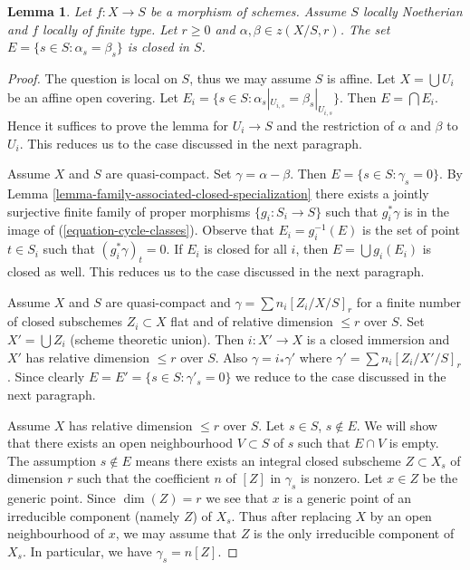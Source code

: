 \documentclass{stacks-project}
\theoremstyle{plain}
\newtheorem{lemma}[subsection]{Lemma}
\theoremstyle{definition}
\theoremstyle{remark}
\numberwithin{equation}{subsection}
\begin{document}
\begin{lemma}
\label{lemma-relative-cycles-equal}
Let $f : X \to S$ be a morphism of schemes. Assume $S$ locally Noetherian
and $f$ locally of finite type. Let $r \geq 0$ and
$\alpha, \beta \in z(X/S, r)$. The set $E = \{s \in S : \alpha_s = \beta_s\}$
is closed in $S$.
\end{lemma}

\begin{proof}
The question is local on $S$, thus we may assume $S$ is affine.
Let $X = \bigcup U_i$ be an affine open covering. Let
$E_i = \{s \in S : \alpha_s|_{U_{i, s}} = \beta_s|_{U_{i, s}}\}$.
Then $E = \bigcap E_i$. Hence it suffices to prove the lemma for
$U_i \to S$ and the restriction of $\alpha$ and $\beta$ to $U_i$.
This reduces us to the case discussed in the next paragraph.

\medskip\noindent
Assume $X$ and $S$ are quasi-compact.
Set $\gamma = \alpha - \beta$. Then $E = \{s \in S : \gamma_s = 0\}$.
By Lemma \ref{lemma-family-associated-closed-specialization}
there exists a jointly surjective finite family of proper morphisms
$\{g_i : S_i \to S\}$ such that $g_i^*\gamma$ is in the image
of (\ref{equation-cycle-classes}). Observe that $E_i = g_i^{-1}(E)$ is
the set of point $t \in S_i$ such that $(g_i^*\gamma)_t = 0$.
If $E_i$ is closed for all $i$, then $E = \bigcup g_i(E_i)$
is closed as well. This reduces us to the case discussed in the next
paragraph.

\medskip\noindent
Assume $X$ and $S$ are quasi-compact and $\gamma = \sum n_i[Z_i/X/S]_r$
for a finite number of closed subschemes $Z_i \subset X$
flat and of relative dimension $\leq r$ over $S$.
Set $X' = \bigcup Z_i$ (scheme theoretic union).
Then $i : X' \to X$ is a closed immersion and $X'$
has relative dimension $\leq r$ over $S$. Also
$\gamma = i_*\gamma'$ where $\gamma' = \sum n_i[Z_i/X'/S]_r$.
Since clearly $E = E' = \{s \in S : \gamma'_s = 0\}$
we reduce to the case discussed in the next paragraph.

\medskip\noindent
Assume $X$ has relative dimension $\leq r$ over $S$.
Let $s \in S$, $s \not \in E$. We will show that there exists an
open neighbourhood $V \subset S$ of $s$ such that $E \cap V$ is empty.
The assumption $s \not \in E$ means there exists an integral closed
subscheme $Z \subset X_s$ of dimension $r$ such that the coefficient
$n$ of $[Z]$ in $\gamma_s$ is nonzero. Let $x \in Z$ be the
generic point. Since $\dim(Z) = r$ we see that $x$ is a generic
point of an irreducible component (namely $Z$) of $X_s$.
Thus after replacing $X$ by an open neighbourhood of $x$,
we may assume that $Z$ is the only irreducible component of $X_s$.
In particular, we have $\gamma_s = n[Z]$.


\end{proof}
\end{document}
